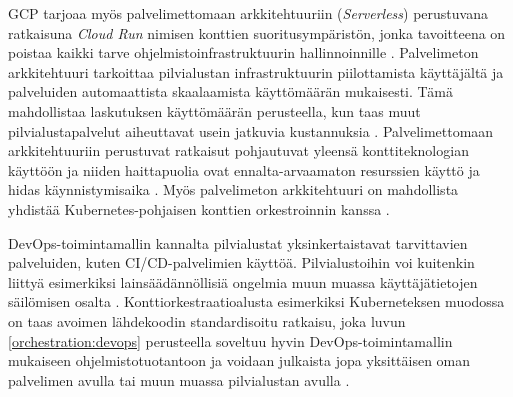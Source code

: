 GCP tarjoaa myös palvelimettomaan arkkitehtuuriin (\textit{Serverless}) perustuvana ratkaisuna \textit{Cloud Run} nimisen konttien suoritusympäristön, jonka tavoitteena on poistaa kaikki tarve ohjelmistoinfrastruktuurin hallinnoinnille \cite{Products23}.
Palvelimeton arkkitehtuuri tarkoittaa pilvialustan infrastruktuurin piilottamista käyttäjältä ja palveluiden automaattista skaalaamista käyttömäärän mukaisesti.
Tämä mahdollistaa laskutuksen käyttömäärän perusteella, kun taas muut pilvialustapalvelut aiheuttavat usein jatkuvia kustannuksia \cite{shafiei22}.
Palvelimettomaan arkkitehtuuriin perustuvat ratkaisut pohjautuvat yleensä konttiteknologian käyttöön ja niiden haittapuolia ovat ennalta-arvaamaton resurssien käyttö ja hidas käynnistymisaika \cite{shafiei22, mondal22}.
Myös palvelimeton arkkitehtuuri on mahdollista yhdistää Kubernetes-pohjaisen konttien orkestroinnin kanssa \cite{mondal22}. 

DevOps-toimintamallin kannalta pilvialustat yksinkertaistavat tarvittavien palveluiden, kuten CI/CD-palvelimien käyttöä.
Pilvialustoihin voi kuitenkin liittyä esimerkiksi lainsäädännöllisiä ongelmia muun muassa käyttäjätietojen säilömisen osalta \cite{Barati22}.
Konttiorkestraatioalusta esimerkiksi Kuberneteksen muodossa on taas avoimen lähdekoodin standardisoitu ratkaisu, joka luvun \ref{orchestration:devops} perusteella soveltuu hyvin DevOps-toimintamallin mukaiseen ohjelmistotuotantoon ja voidaan julkaista jopa yksittäisen oman palvelimen avulla tai muun muassa pilvialustan avulla \cite{Muddinagiri19, Khan22}.
